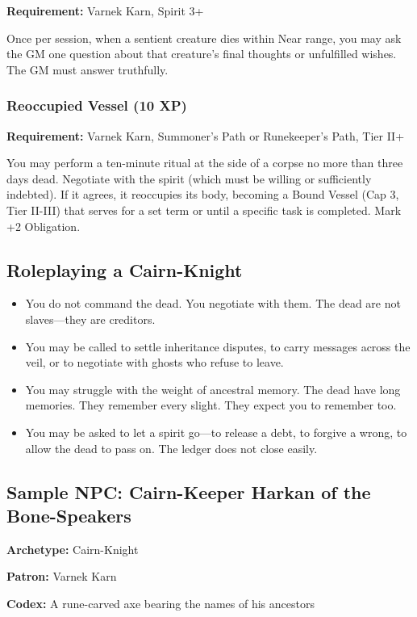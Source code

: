 \textbf{Requirement:} Varnek Karn, Spirit 3+

Once per session, when a sentient creature dies within Near range, you may ask the GM one question about that creature's final thoughts or unfulfilled wishes. The GM must answer truthfully.

\subsubsection{Reoccupied Vessel (10 XP)}

\textbf{Requirement:} Varnek Karn, Summoner's Path or Runekeeper's Path, Tier II+

You may perform a ten-minute ritual at the side of a corpse no more than three days dead. Negotiate with the spirit (which must be willing or sufficiently indebted). If it agrees, it reoccupies its body, becoming a Bound Vessel (Cap 3, Tier II-III) that serves for a set term or until a specific task is completed. Mark +2 Obligation.

\subsection{Roleplaying a Cairn-Knight}

\begin{itemize}
\item You do not command the dead. You negotiate with them. The dead are not slaves—they are creditors.
\item You may be called to settle inheritance disputes, to carry messages across the veil, or to negotiate with ghosts who refuse to leave.
\item You may struggle with the weight of ancestral memory. The dead have long memories. They remember every slight. They expect you to remember too.
\item You may be asked to let a spirit go—to release a debt, to forgive a wrong, to allow the dead to pass on. The ledger does not close easily.
\end{itemize}

\subsection{Sample NPC: Cairn-Keeper Harkan of the Bone-Speakers}

\textbf{Archetype:} Cairn-Knight

\textbf{Patron:} Varnek Karn

\textbf{Codex:} A rune-carved axe bearing the names of his ancestors


